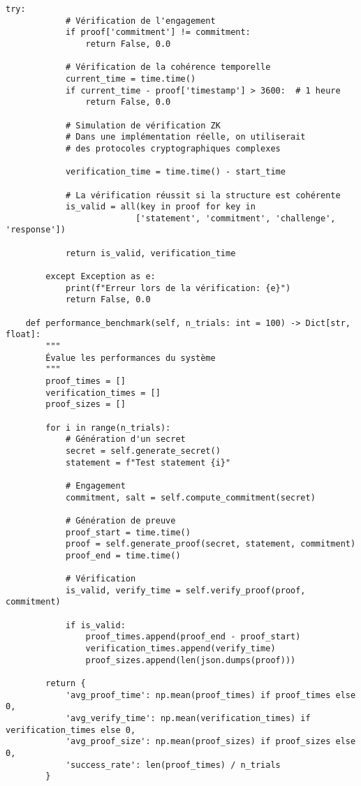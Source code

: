 \documentclass[12pt,a4paper]{article}
\begin{document}
\begin{lstlisting}[caption=Prototype ZK-NR (Zero-Knowledge Non-Repudiation)]
        try:
            # Vérification de l'engagement
            if proof['commitment'] != commitment:
                return False, 0.0
            
            # Vérification de la cohérence temporelle
            current_time = time.time()
            if current_time - proof['timestamp'] > 3600:  # 1 heure
                return False, 0.0
            
            # Simulation de vérification ZK
            # Dans une implémentation réelle, on utiliserait
            # des protocoles cryptographiques complexes
            
            verification_time = time.time() - start_time
            
            # La vérification réussit si la structure est cohérente
            is_valid = all(key in proof for key in 
                          ['statement', 'commitment', 'challenge', 'response'])
            
            return is_valid, verification_time
            
        except Exception as e:
            print(f"Erreur lors de la vérification: {e}")
            return False, 0.0
    
    def performance_benchmark(self, n_trials: int = 100) -> Dict[str, float]:
        """
        Évalue les performances du système
        """
        proof_times = []
        verification_times = []
        proof_sizes = []
        
        for i in range(n_trials):
            # Génération d'un secret
            secret = self.generate_secret()
            statement = f"Test statement {i}"
            
            # Engagement
            commitment, salt = self.compute_commitment(secret)
            
            # Génération de preuve
            proof_start = time.time()
            proof = self.generate_proof(secret, statement, commitment)
            proof_end = time.time()
            
            # Vérification
            is_valid, verify_time = self.verify_proof(proof, commitment)
            
            if is_valid:
                proof_times.append(proof_end - proof_start)
                verification_times.append(verify_time)
                proof_sizes.append(len(json.dumps(proof)))
        
        return {
            'avg_proof_time': np.mean(proof_times) if proof_times else 0,
            'avg_verify_time': np.mean(verification_times) if verification_times else 0,
            'avg_proof_size': np.mean(proof_sizes) if proof_sizes else 0,
            'success_rate': len(proof_times) / n_trials
        }


\end{lstlisting}
\end{document}

